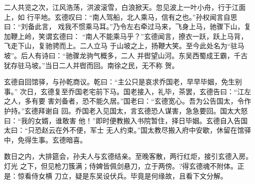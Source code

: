 二人共览之次，江风浩荡，洪波滚雪，白浪掀天。忽见波上一叶小舟，行于江面上，如
行平地。玄德叹曰：“南人驾船，北人乘马，信有之也。”孙权闻言自思曰：“刘备此言，
戏我不惯乘马耳。”乃令左右牵过马来，飞身上马，驰骤下山，复加鞭上岭，笑谓玄德曰：
“南人不能乘马乎？”玄德闻言，撩衣一跃，跃上马背，飞走下山，复驰骋而上。二人立马
于山坡之上，扬鞭大笑。至今此处名为“驻马坡”。后人有诗曰：“驰骤龙驹气概多，二人
并辔望山河。东吴西蜀成王霸，千古犹存驻马坡。”当日二人并辔而回。南徐之民，无不称
贺。

玄德自回馆驿，与孙乾商议。乾曰：“主公只是哀求乔国老，早早毕姻，免生别事。”
次日，玄德复至乔国老宅前下马。国老接入，礼毕，茶罢，玄德告曰：“江左之人，多有要
害刘备者，恐不能久居。”国老曰：“玄德宽心。吾为公告国太，令作护持。”玄德拜谢自
回。乔国老入见国太，言玄德恐人谋害，急急要回。国太大怒曰：“我的女婿，谁敢害
他！”即时便教搬入书院暂住，择日毕姻。玄德自入告国太曰：“只恐赵云在外不便，军士
无人约束。”国太教尽搬入府中安歇，休留在馆驿中，免得生事。玄德暗喜。

数日之内，大排筵会，孙夫人与玄德结亲。至晚客散，两行红炬，接引玄德入房。灯光
之下，但见枪刀簇满；侍婢皆佩剑悬刀，立于两傍。?得玄德魂不附体。正是：惊看侍女横
刀立，疑是东吴设伏兵。毕竟是何缘故，且看下文分解。